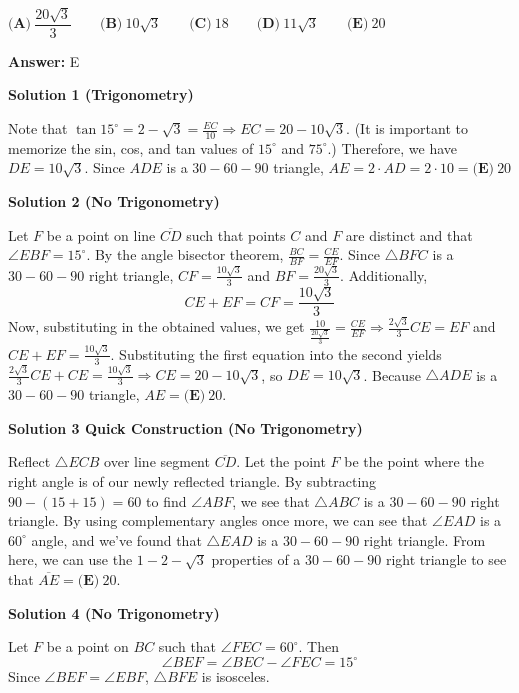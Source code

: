 \begin{enumerate}
 $\textbf{(A)}\ \dfrac{20\sqrt3}3\qquad\textbf{(B)}\ 10\sqrt3\qquad\textbf{(C)}\ 18\qquad\textbf{(D)}\ 11\sqrt3\qquad\textbf{(E)}\ 20$

 \textbf{Answer: }E



\textbf{Solution 1 (Trigonometry)}

Note that $\tan 15^\circ=2-\sqrt{3}=\frac{EC}{10} \Rightarrow EC=20-10 \sqrt 3$. (It is important to memorize the sin, cos, and tan values of $15^\circ$ and $75^\circ$.) Therefore, we have $DE=10\sqrt 3$. Since $ADE$ is a $30-60-90$ triangle, $AE=2 \cdot AD=2 \cdot 10=\boxed{\textbf{(E)} \: 20}$




\textbf{Solution 2 (No Trigonometry)}

Let $F$ be a point on line $\overline{CD}$ such that points $C$ and $F$ are distinct and that $\angle EBF = 15^\circ$. By the angle bisector theorem, $\frac{BC}{BF} = \frac{CE}{EF}$. Since $\triangle BFC$ is a $30-60-90$ right triangle, $CF = \frac{10\sqrt{3}}{3}$ and $BF = \frac{20\sqrt{3}}{3}$. Additionally, 
 \[CE + EF = CF = \frac{10\sqrt{3}}{3}\]Now, substituting in the obtained values, we get $\frac{10}{\frac{20\sqrt{3}}{3}} = \frac{CE}{EF} \Rightarrow \frac{2\sqrt{3}}{3}CE = EF$ and $CE + EF = \frac{10\sqrt{3}}{3}$. Substituting the first equation into the second yields $\frac{2\sqrt{3}}{3}CE + CE = \frac{10\sqrt{3}}{3} \Rightarrow CE = 20 - 10\sqrt{3}$, so $DE = 10\sqrt{3}$. Because $\triangle ADE$ is a $30-60-90$ triangle, $AE = \boxed{\textbf{(E)}~20}$.

 



\textbf{Solution 3 Quick Construction (No Trigonometry)}

Reflect $\triangle {ECB}$ over line segment $\overline {CD}$. Let the point $F$ be the point where the right angle is of our newly reflected triangle. By subtracting $90 - (15+15) = 60$ to find $\angle ABF$, we see that $\triangle{ABC}$ is a $30-60-90$ right triangle. By using complementary angles once more, we can see that $\angle{EAD}$ is a $60^\circ$ angle, and we've found that $\triangle{EAD}$ is a $30-60-90$ right triangle. From here, we can use the $1-2-\sqrt{3}$ properties of a $30-60-90$ right triangle to see that $\overline{AE}=\boxed{\textbf{(E)}~20}.$




\textbf{Solution 4 (No Trigonometry)}

Let $F$ be a point on $BC$ such that $\angle{FEC}=60^{\circ}$. Then 
 \[\angle{BEF}=\angle{BEC}-\angle{FEC}=15^{\circ}\] Since $\angle{BEF}=\angle{EBF}$, $\bigtriangleup{BFE}$ is isosceles.


\end{enumerate}

